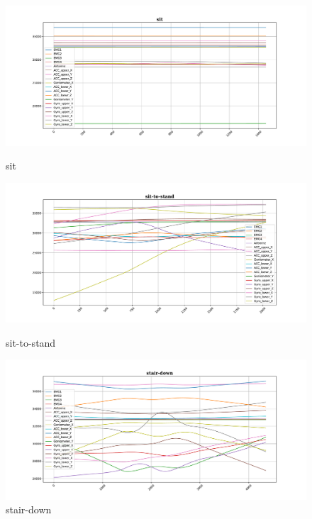 \begin{figure}[!tbp]
	\begin{minipage}[b]{0.31\textwidth}
		\includegraphics[width=\textwidth]{images/sit_example.pdf}
		\caption{sit}
	\end{minipage}
	\begin{minipage}[b]{0.31\textwidth}
		\includegraphics[width=\textwidth]{images/sit-to-stand_example.pdf}
		\caption{sit-to-stand}
	\end{minipage}
	\begin{minipage}[b]{0.31\textwidth}
		\includegraphics[width=\textwidth]{images/stair-down_example.pdf}
		\caption{stair-down}
	\end{minipage}
\end{figure}


